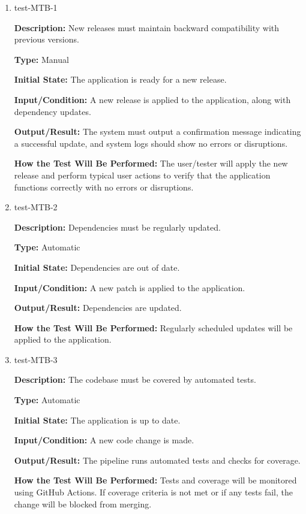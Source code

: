 \documentclass[12pt, titlepage]{article}
\begin{document}
\begin{enumerate}

\item{test-MTB-1\\}

\textbf{Description:} New releases must maintain backward compatibility with
previous versions.

\textbf{Type:} Manual
					
\textbf{Initial State:} The application is ready for a new release.
					
\textbf{Input/Condition:} A new release is applied to the application, along
with dependency updates.
					
\textbf{Output/Result:} The system must output a confirmation message indicating
a successful update, and system logs should show no errors or disruptions.
					
\textbf{How the Test Will Be Performed:} The user/tester will apply the new
release and perform typical user actions to verify that the application
functions correctly with no errors or disruptions.

\item{test-MTB-2\\}

\textbf{Description:} Dependencies must be regularly updated.

\textbf{Type:} Automatic
					
\textbf{Initial State:} Dependencies are out of date.
					
\textbf{Input/Condition:} A new patch is applied to the application.
					
\textbf{Output/Result:} Dependencies are updated.
					
\textbf{How the Test Will Be Performed:} Regularly scheduled updates will be
applied to the application.

\item{test-MTB-3\\}

\textbf{Description:} The codebase must be covered by automated tests.

\textbf{Type:} Automatic
					
\textbf{Initial State:} The application is up to date.
					
\textbf{Input/Condition:} A new code change is made.
					
\textbf{Output/Result:} The pipeline runs automated tests and checks for
coverage. 
					
\textbf{How the Test Will Be Performed:} Tests and coverage will be monitored
using GitHub Actions. If coverage criteria is not met or if any tests fail, the
change will be blocked from merging.

\end{enumerate}
\end{document}
